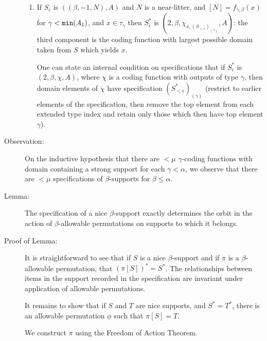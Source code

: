 \documentclass[112pt]{article}
\begin{document}
\begin{description}
\begin{enumerate}
\item  If $S_\epsilon$ is $((\beta,-1,N),A)$ and $N$ is a near-litter, and $[N]=f_{\gamma,\beta}(x)$ for $\gamma<{\tt min}(A_1)$, and $x\in \tau_\gamma$ then 
$S^*_\epsilon$ is $(2,\beta,\chi_{x,(S_{<\epsilon})_{(\gamma)}},A)$:  the third component is the coding function with largest possible domain taken from $S$ which yields $x$.

One can state an internal condition on specifications that if $S^*_\epsilon$ is $(2,\beta,\chi,A)$, where $\chi$ is a coding function with outputs of type
$\gamma$, then domain elements of $\chi$ have specification $(S^*_{<\epsilon})_{(\gamma)}$ (restrict to earlier elements of the specification, then remove the top element from each extended type index and retain only those which then have top element $\gamma$).

\end{enumerate}

\begin{comment}

Peter wants a definition of the type specification independent of the type support.  Use tags.   It's a good idea.

\end{comment}

\item[Observation:]  On the inductive hypothesis that there are $<\mu$ $\gamma$-coding functions with domain containing a strong support for each $\gamma<\alpha$, we observe that there are $<\mu$ specifications of $\beta$-supports for $\beta\leq \alpha$.

\item[Lemma:]  The specification of a nice $\beta$-support exactly determines the orbit in the action of $\beta$-allowable permutations on supports to which it belongs.

\item[Proof of Lemma:]

It is straightforward to see that if $S$ is a nice $\beta$-support and if $\pi$ is a $\beta$-allowable permutation, that $(\pi[S])^* = S^*$.  The relationships between items in the support recorded in the specification are invariant under application of allowable permutations.

It remains to show that if $S$ and $T$ are nice supports, and $S^*=T^*$, there is an allowable permutation $\phi$ such that $\pi[S]=T$.

We construct $\pi$ using the Freedom of Action Theorem.


\end{description}
\end{document}
